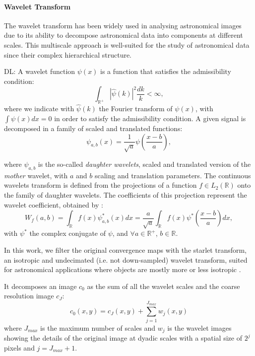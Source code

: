 \documentclass[twocolumn,twocolappendix]{aastex63}
\newcommand{\denise}[1]{{\color{red}DL: #1}}
\begin{document}
\paragraph{Wavelet Transform} The wavelet transform has been widely used in analysing astronomical images due to its ability to decompose astronomical data into components at different scales. 
This multiscale approach is well-suited for the study of astronomical data since their complex hierarchical structure. \denise{A wavelet function $\psi(x)$ is a function that satisfies the admissibility condition:
\begin{equation}
    \int_{\mathbb{R}^{+}} |\hat{\psi}(k)|^2 \frac{dk}{k}<\infty,
\end{equation}
where we indicate with $\hat{\psi}(k)$ the Fourier transform of $\psi(x)$, with $\int\psi(x)dx=0$ in order to satisfy the admissibility condition. 
A given signal is decomposed in a family of scaled and translated functions:
\begin{equation}
    \psi_{a,b}(x)=\frac{1}{\sqrt{a}}\psi \left( \frac{x-b}{a}\right),
\end{equation}

where $\psi_{a,b}$ is the so-called \textit{daughter wavelets}, scaled and translated version of the \textit{mother} wavelet, with $a$ and $b$ scaling and translation parameters.
The continuous wavelets transform is defined from the projections of a function $f \in L_2(\mathbb{R})$ onto the family of daughter wavelets. The coefficients of this projection represent the wavelet coefficient, obtained by :
\begin{equation}
    W_f(a,b)=\int_{\mathbb{R}} f(x)\psi^{*}_{a,b}(x)dx=\frac{a}{\sqrt{a}}\int_{\mathbb{R}}f(x)\psi^{*}\left( \frac{x-b}{a}\right)dx ,
\end{equation}
with $\psi^{*}$ the complex conjugate of $\psi$, and $ \forall a \in \mathbb{R}^{+}$, $ b \in \mathbb{R.}$  }
In this work, we filter the original convergence maps with the starlet transform, an isotropic and undecimated (i.e. not down-sampled)  wavelet transform, suited for astronomical applications where objects are mostly more or less isotropic \citep{4060954}.

It decomposes an image $c_0$ as the sum of all the wavelet scales and the coarse resolution image $c_J$:
\begin{equation}\label{wav_des}
    c_0(x,y)=c_J(x,y)+\sum_{j=1}^{J_{max}} w_j(x,y)
\end{equation}
where $J_{max}$ is the maximum number of scales and $w_j$ is the wavelet images showing the details of the original image at dyadic scales with a spatial size of $2^j$ pixels and $j = J_{max} + 1$. 
\end{document}

